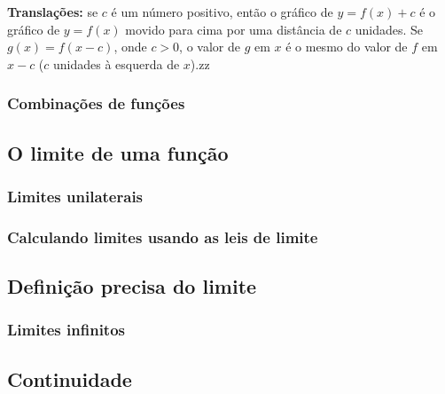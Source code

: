 \textbf{Translações:} se $c$ é um número positivo, então o gráfico de $y=f(x)+c$ é o gráfico de $y=f(x)$ movido para cima por uma distância de $c$ unidades. Se $g(x) = f(x-c)$, onde $c>0$, o valor de $g$ em $x$ é o mesmo do valor de $f$ em $x-c$ ($c$ unidades à esquerda de $x$).zz

\subsubsection{Combinações de funções}

\subsection{O limite de uma função}

\subsubsection{Limites unilaterais}

\subsubsection{Calculando limites usando as leis de limite}

\subsection{Definição precisa do limite}
\subsubsection{Limites infinitos}
\subsection{Continuidade}

